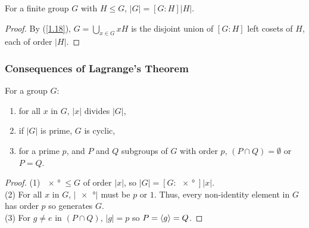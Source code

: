 For a finite group $G$ with $H \leq G$, $|G| = [G : H]|H|$.

\begin{proof}
    By (\ref{1.18}), $G = \bigcup_{x \in G} xH$ is the disjoint union of
    $[G : H]$ left cosets of $H$, each of order $|H|$.
\end{proof}

\newpage

\subsubsection{Consequences of Lagrange's Theorem}

For a group $G$: \begin{enumerate}
    \item for all $x$ in $G$, $|x|$ divides $|G|$,
    \item if $|G|$ is prime, $G$ is cyclic,
    \item for a prime $p$, and $P$ and $Q$ subgroups of $G$ with order $p$,
        $(P \cap Q) = \emptyset$ or $P = Q$.
\end{enumerate}

\begin{proof}
    (1) $\ang{x} \leq G$ of order $|x|$, so $|G| = [G : \ang{x}]|x|$. \\[\baselineskip]
    (2) For all $x$ in $G$, $|\ang{x}|$ must be $p$ or $1$. Thus, every non-identity
    element in $G$ has order $p$ so generates $G$. \\[\baselineskip]
    (3) For $g \neq e$ in $(P \cap Q)$, $|g| = p$ so $P = {\langle g \rangle} = Q$.
\end{proof}
